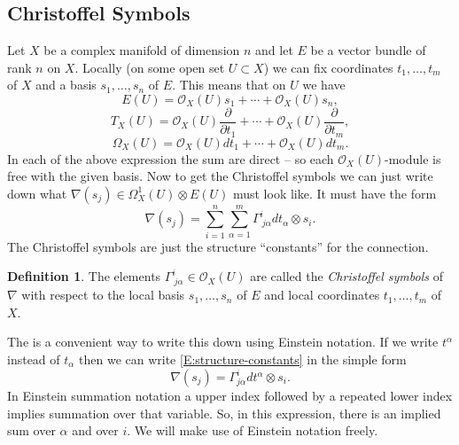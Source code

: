 \documentclass[12pt]{book}
\numberwithin{equation}{section}
\theoremstyle{definition}
\newtheorem{definition}[theorem]{Definition}
\theoremstyle{remark}
\newcommand{\Ocal}{\mathcal{O}}
\begin{document}
\subsection{Christoffel Symbols}
Let $X$ be a complex manifold of dimension $n$ and let $E$ be a vector bundle of rank $n$ on $X$.
Locally (on some open set $U\subset X$) we can fix coordinates $t_1,\ldots,t_m$ of $X$ and a basis $s_1,\ldots,s_n$ of $E$. 
This means that on $U$ we have 
$$ E(U) = \Ocal_X(U)s_1 + \cdots + \Ocal_X(U)s_n,$$
$$ T_X(U) = \Ocal_X(U) \dfrac{\partial }{\partial t_1} + \cdots + \Ocal_X(U) \dfrac{\partial}{\partial t_m},$$
$$ \Omega_X(U) = \Ocal_X(U)dt_1 + \cdots + \Ocal_X(U)dt_m.$$
In each of the above expression the sum are direct -- so each $\Ocal_X(U)$-module is free with the given basis. 
Now to get the Christoffel symbols we can just write down what $\nabla(s_j) \in \Omega^1_X(U) \otimes E(U)$ must look like. 
It must have the form
\begin{equation}\label{E:structure-constants}
\nabla(s_j) = \sum_{i=1}^n\sum_{\alpha=1}^m \Gamma^i_{\ j \alpha} dt_{\alpha} \otimes s_i.
\end{equation}
The Christoffel symbols are just the structure ``constants'' for the connection.
\begin{definition}
	The elements $\Gamma^i_{\ j \alpha} \in \Ocal_X(U)$ are called the \emph{Christoffel symbols} of $\nabla$ with respect to the local basis $s_1,\ldots,s_n$ of $E$ and local coordinates $t_1,\ldots,t_m$ of $X$.
\end{definition}
The is a convenient way to write this down using Einstein notation. 
If we write $t^{\alpha}$ instead of $t_{\alpha}$ then we can write \eqref{E:structure-constants} in the simple form
$$\nabla(s_j) = \Gamma^i_{j\alpha} dt^{\alpha}\otimes s_i.$$
In Einstein summation notation a upper index followed by a repeated lower index implies summation over that variable. 
So, in this expression, there is an implied sum over $\alpha$ and over $i$. 
We will make use of Einstein notation freely. 

\end{document}
